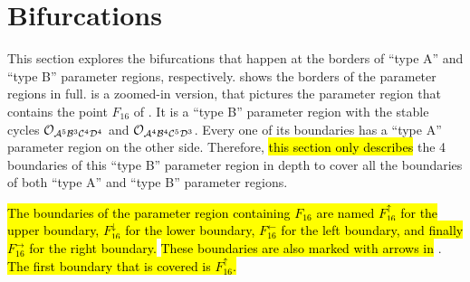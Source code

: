\section{Bifurcations}
\label{sec:arch.bif}

This section explores the bifurcations that happen at the borders of ``type A'' and ``type B'' parameter regions, respectively.
 shows the borders of the parameter regions in full.
 is a zoomed-in version, that pictures the parameter region that contains the point $F_{16}$ of .
It is a ``type B'' parameter region with the stable cycles $\mathcal{O}_{\mathcal{A}^5\mathcal{B}^3\mathcal{C}^4\mathcal{D}^4}$ and $\mathcal{O}_{\mathcal{A}^4\mathcal{B}^4\mathcal{C}^5\mathcal{D}^3}$.
Every one of its boundaries has a ``type A'' parameter region on the other side.
Therefore, \hl{this section only describes} the 4 boundaries of this ``type B'' parameter region in depth to cover all the boundaries of both ``type A'' and ``type B'' parameter regions.

\hl{
	The boundaries of the parameter region containing $F_{16}$ are named $F_{16}^\uparrow$ for the upper boundary, $F_{16}^\downarrow$ for the lower boundary, $F_{16}^\leftarrow$ for the left boundary, and finally $F_{16}^\rightarrow$ for the right boundary.
}
\hl{These boundaries are also marked with arrows in} .
\hl{
	The first boundary that is covered is $F_{16}^\uparrow$.
}

